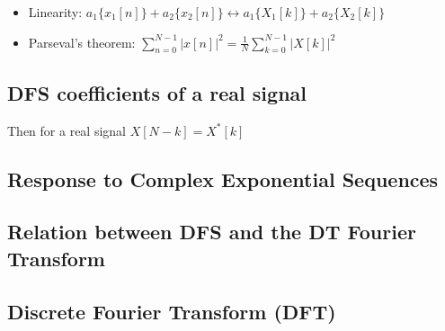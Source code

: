 \documentclass[8pt,a4paper]{scrartcl}
\begin{document}
\begin{multicols*}{3}
\begin{itemize}
\item Linearity: $a_1\{x_1[n]\}+a_2\{x_2[n]\}\longleftrightarrow a_1\{X_1[k]\}+a_2\{X_2[k]\}$
\item Parseval's theorem: $\sum\limits_{n=0}^{N-1}|x[n]|^2=\frac{1}{N}\sum\limits_{k=0}^{N-1}|X[k]|^2$
\end{itemize}

\subsection{DFS coefficients of a real signal}


Then for a real signal $X[N-k]=X^\ast[k]$




\subsection{Response to Complex Exponential Sequences}



\subsection{Relation between DFS and the DT Fourier Transform}



\subsection{Discrete Fourier Transform (DFT)}


\end{multicols*}
\end{document}
